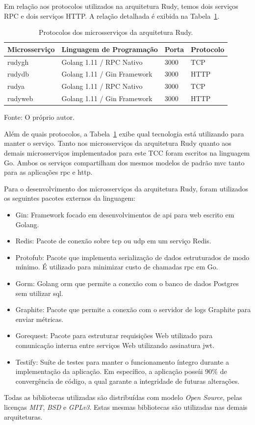 Em relação aos protocolos utilizados na arquitetura Rudy, temos dois serviços RPC e dois serviços HTTP. %
%
A relação detalhada é exibida na Tabela~\ref{tab:protocolos_rudy}.



\begin{table}[htb!]
    \centering
    \caption{Protocolos dos microsserviços da arquitetura Rudy.}
    \label{tab:protocolos_rudy}
    \begin{tabular}{|l|l|l|l|}
    \hline
    Microsserviço & Linguagem de Programação    & Porta & Protocolo \\ \hline
    rudygh        & Golang 1.11 / RPC Nativo    & 3000  & TCP       \\ \hline
    rudydb        & Golang 1.11 / Gin Framework & 3000  & HTTP      \\ \hline
    rudya         & Golang 1.11 / RPC Nativo    & 3000  & TCP       \\ \hline
    rudyweb       & Golang 1.11 / Gin Framework & 3000  & HTTP      \\ \hline
    \end{tabular}
    
    Fonte: O próprio autor.
\end{table}


Além de quais protocolos, a Tabela~\ref{tab:protocolos_rudy} exibe qual tecnologia está utilizando para manter o serviço.
%
Tanto nos microsserviços da arquitetura Rudy quanto aos demais microsserviços implementados para este TCC foram escritos na linguagem Go.
%
Ambos os serviços compartilham dos mesmos modelos de padrão \ac{mvc} tanto para as aplicações \ac{rpc} e \ac{http}.

Para o desenvolvimento dos microsserviços da arquitetura Rudy, foram utilizados os seguintes pacotes externos da linguagem:

\begin{itemize}
    \item Gin: Framework focado em desenvolvimentos de \ac{api} para web escrito em Golang.
    \item Redis: Pacote de conexão sobre \ac{tcp} ou \ac{udp} em um serviço Redis.
    \item Protofub: Pacote que implementa serialização de dados estruturados de modo mínimo. É utilizado para minimizar custo de chamadas \ac{rpc} em Go.
    \item Gorm: Golang \ac{orm} que permite a conexão com o banco de dados Postgres sem utilizar \ac{sql}.
    \item Graphite: Pacote que permite a conexão com o servidor de logs Graphite para enviar métricas.
    \item Gorequest: Pacote para estruturar requisições Web utilizado para comunicação interna entre serviços Web utilizando assinatura \ac{jwt}.
    \item Testify: Suíte de testes para manter o funcionamento íntegro durante a implementação da aplicação. Em específico, a aplicação possúi 90\% de convergência de código, a qual garante a integridade de futuras alterações.
\end{itemize}

Todas as bibliotecas utilizadas são distribuídas com modelo \textit{Open Source}, pelas licenças \textit{MIT}, \textit{BSD} e \textit{GPLv3}.
%
Estas mesmas bibliotecas são utilizadas nas demais arquiteturas.
